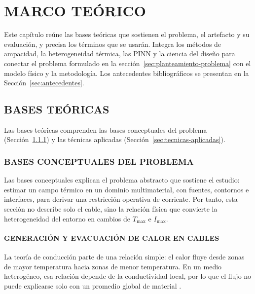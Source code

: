\documentclass[11pt,a4paper,oneside]{report}
\newcommand{\Tmax}{T_{\max}}
\newcommand{\Imax}{I_{\max}}
\begin{document}
\chapter{MARCO TEÓRICO}
\label{ch:marco-teorico}
\thispagestyle{empty}

Este capítulo reúne las bases teóricas que sostienen el problema, el artefacto y su evaluación, y precisa los términos que se usarán. Integra los métodos de ampacidad, la heterogeneidad térmica, las PINN y la ciencia del diseño para conectar el problema formulado en la sección~\ref{sec:planteamiento-problema} con el modelo físico y la metodología. Los antecedentes bibliográficos se presentan en la Sección~\ref{sec:antecedentes}.

\section{BASES TEÓRICAS}
\label{sec:bases-teoricas}

Las bases teóricas comprenden las bases conceptuales del problema (Sección~\ref{sec:bases-conceptuales}) y las técnicas aplicadas (Sección~\ref{sec:tecnicas-aplicadas}).

\subsection{BASES CONCEPTUALES DEL PROBLEMA}
\label{sec:bases-conceptuales}

Las bases conceptuales explican el problema abstracto que sostiene el estudio: estimar un campo térmico en un dominio multimaterial, con fuentes, contornos e interfaces, para derivar una restricción operativa de corriente. Por tanto, esta sección no describe solo el cable, sino la relación física que convierte la heterogeneidad del entorno en cambios de $\Tmax$ e $\Imax$.

\subsubsection{GENERACIÓN Y EVACUACIÓN DE CALOR EN CABLES}
\label{subsec:generacion-evacuacion-calor}

La teoría de conducción parte de una relación simple: el calor fluye desde zonas de mayor temperatura hacia zonas de menor temperatura. En un medio heterogéneo, esa relación depende de la conductividad local, por lo que el flujo no puede explicarse solo con un promedio global de material \parencites{carslaw1959conduction,kakac2018heatConduction,hahn2012heatConduction}.
\end{document}
